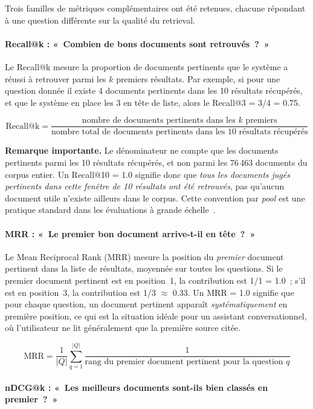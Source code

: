 Trois familles de métriques complémentaires ont été retenues, chacune répondant à une question différente sur la qualité du retrieval.

\paragraph{Recall@k : «~Combien de bons documents sont retrouvés~?~»}

Le Recall@k mesure la proportion de documents pertinents que le système a réussi à retrouver parmi les $k$ premiers résultats. Par exemple, si pour une question donnée il existe 4 documents pertinents dans les 10 résultats récupérés, et que le système en place les 3 en tête de liste, alors le Recall@3 = 3/4 = 0.75.

\[
\text{Recall@k} = \frac{\text{nombre de documents pertinents dans les } k \text{ premiers}}{\text{nombre total de documents pertinents dans les 10 résultats récupérés}}
\]

\noindent\textbf{Remarque importante.} Le dénominateur ne compte que les documents pertinents parmi les 10 résultats récupérés, et non parmi les 76\,463 documents du corpus entier. Un Recall@10 = 1.0 signifie donc que \emph{tous les documents jugés pertinents dans cette fenêtre de 10 résultats ont été retrouvés}, pas qu'aucun document utile n'existe ailleurs dans le corpus. Cette convention par \textit{pool} est une pratique standard dans les évaluations à grande échelle~\cite{thakur2021beir}.

\paragraph{MRR : «~Le premier bon document arrive-t-il en tête~?~»}

Le Mean Reciprocal Rank (MRR) mesure la position du \emph{premier} document pertinent dans la liste de résultats, moyennée sur toutes les questions. Si le premier document pertinent est en position~1, la contribution est 1/1 = 1.0~; s'il est en position~3, la contribution est 1/3 $\approx$ 0.33. Un MRR = 1.0 signifie que pour chaque question, un document pertinent apparaît \emph{systématiquement} en première position, ce qui est la situation idéale pour un assistant conversationnel, où l'utilisateur ne lit généralement que la première source citée.

\[
\text{MRR} = \frac{1}{|Q|} \sum_{q=1}^{|Q|} \frac{1}{\text{rang du premier document pertinent pour la question } q}
\]

\paragraph{nDCG@k : «~Les meilleurs documents sont-ils bien classés en premier~?~»}

